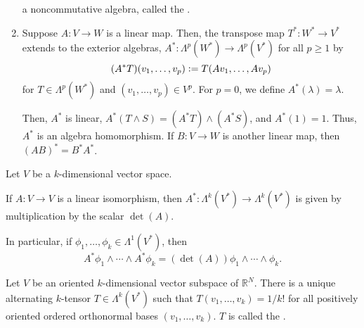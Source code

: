 \documentclass[12pt]{article}
\begin{document}
\begin{enumerate}[leftmargin=*]
\begin{equation*}
	\end{equation*}
	a noncommutative algebra, called the .
	\item Suppose $A : V \to W$ is a linear map. Then, the transpose map $T^{\ast} : W^{\ast} \to V^{\ast}$ extends to the exterior algebras, $A^{\ast} : \Lambda^{p}(W^{\ast}) \to \Lambda^{p}(V^{\ast})$ for all $p \ge 1$ by
	\begin{equation*} 
		(A^{\ast}T)(v_{1}, \ldots, v_{p}) \vcentcolon= T(Av_{1}, \ldots, Av_{p})
	\end{equation*}
	for $T \in \Lambda^{p}(W^{\ast})$ and $(v_{1}, \ldots, v_{p}) \in V^{p}$. For $p = 0$, we define $A^{\ast}(\lambda) = \lambda$.

	Then, $A^{\ast}$ is linear, $A^{\ast}(T \wedge S) = (A^{\ast} T) \wedge (A^{\ast} S)$, and $A^{\ast}(1) = 1$. Thus, $A^{\ast}$ is an algebra homomorphism. \newline
	If $B : V \to W$ is another linear map, then $(AB)^{\ast} = B^{\ast} A^\ast$.
\end{enumerate}

\begin{thm} \label{thm:determinant-theorem}
	Let $V$ be a $k$-dimensional vector space.

	If $A : V \to V$ is a linear isomorphism, then $A^{\ast} : \Lambda^{k}(V^{\ast}) \to \Lambda^{k}(V^{\ast})$ is given by multiplication by the scalar $\det(A)$. 

	In particular, if $\phi_{1}, \ldots, \phi_{k} \in \Lambda^{1}(V^{\ast})$, then
	\begin{equation*} 
		A^{\ast} \phi_{1} \wedge \cdots \wedge A^{\ast} \phi_{k} = (\det(A)) \phi_{1} \wedge \cdots \wedge \phi_{k}.
	\end{equation*}
\end{thm}

\begin{defn}
	Let $V$ be an oriented $k$-dimensional vector subspace of $\mathbb{R}^{N}$. There is a unique alternating $k$-tensor $T \in \Lambda^{k}(V^{\ast})$ such that $T(v_{1}, \ldots, v_{k}) = 1/k!$ for all positively oriented ordered orthonormal bases $(v_{1}, \ldots, v_{k})$. $T$ is called the .
\end{defn}
\end{document}
